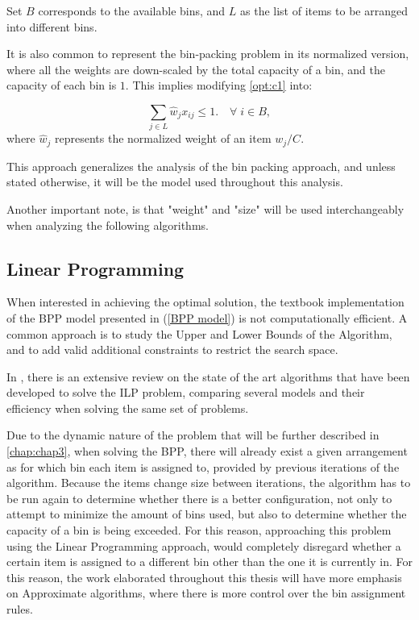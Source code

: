 Set $B$ corresponds to the available bins, and $L$ as the list of items to be arranged into different bins. 

It is also common to represent the bin-packing problem in its normalized version, where all the weights are down-scaled by the total capacity of a bin, and the capacity of each bin is $1$. This implies modifying \ref{opt:c1} into:

\begin{equation}
    \sum_{j \in L} \hat w_j x_{ij} \leq 1. \quad \forall \; i \in B,
\end{equation}
where \(\hat w_j\) represents the normalized weight of an item \( w_j/C \).

This approach generalizes the analysis of the bin packing approach, and unless stated otherwise, it will be the model used throughout this analysis. 

Another important note, is that "weight" and "size" will be used interchangeably when analyzing the following algorithms. 

\subsection{Linear Programming}

When interested in achieving the optimal solution, the textbook implementation of the BPP model presented in (\ref{BPP model}) is not computationally efficient. A common approach is to study the Upper and Lower Bounds of the Algorithm, and to add valid additional constraints to restrict the search space.

In \cite{delorme2016bin}, there is an extensive review on the state of the art algorithms that have been developed to solve the ILP problem, comparing several models and their efficiency when solving the same set of problems. 

Due to the dynamic nature of the problem that will be further described in \ref{chap:chap3}, when solving the BPP, there will already exist a given arrangement as for which bin each item is assigned to, provided by previous iterations of the algorithm. Because the items change size between iterations, the algorithm has to be run again to determine whether there is a better configuration, not only to attempt to minimize the amount of bins used, but also to determine whether the capacity of a bin is being exceeded. For this reason, approaching this problem using the Linear Programming approach, would completely disregard whether a certain item is assigned to a different bin other than the one it is currently in. For this reason, the work elaborated throughout this thesis will have more emphasis on Approximate algorithms, where there is more control over the bin assignment rules.

